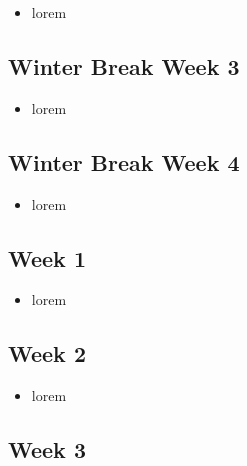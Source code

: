 \documentclass[10pt, onecolumn, draftclsnofoot, letterpaper, compsoc]{IEEEtran}
\begin{document}
    \begin{itemize}

    \item lorem

    \end{itemize}

\subsection{Winter Break Week 3}

    \begin{itemize}

    \item lorem

    \end{itemize}

\subsection{Winter Break Week 4}

    \begin{itemize}

    \item lorem

    \end{itemize}

\subsection{Week 1}

    \begin{itemize}

    \item lorem

    \end{itemize}

\subsection{Week 2}

    \begin{itemize}

    \item lorem

    \end{itemize}

\subsection{Week 3}
\end{document}
